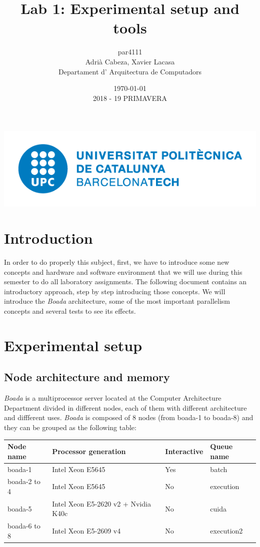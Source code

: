\documentclass[12]{article}
\author{par4111 \\ Adrià Cabeza, Xavier Lacasa \\ Departament d' Arquitectura de Computadors}
\title{Lab 1: Experimental setup and tools}
\date{\today \\ 2018 - 19 PRIMAVERA}
\begin{document}
\maketitle
\vspace*{\fill}
\begin{center}
\includegraphics[scale=0.5]{images/UPClogo.png}
\end{center}

\newpage
\tableofcontents
\newpage
\section{Introduction}
In order to do properly this subject, first, we have to introduce some new concepts and hardware and software environment that we will use during this semester to do all laboratory assignments.  The following document contains an introductory approach, step by step introducing those concepts. We will introduce the \textit{Boada} architecture, some of the most important parallelism concepts and several tests to see its effects. 

\section{Experimental setup}
\subsection{Node architecture and memory}

\textit{Boada} is a multiprocessor server located at the Computer Architecture Department divided in different nodes, each of them with different architecture and diffferent uses. \textit{Boada} is composed of 8 nodes (from boada-1 to boada-8) and they can be grouped as the following table: 
\\
\begin{table}[h]
\begin{tabular}{|l|l|l|l|}
\hline
Node name    & Processor generation                & Interactive & Queue name \\ \hline
boada-1      & Intel Xeon E5645                    & Yes         & batch      \\
boada-2 to 4 & Intel Xeon E5645                    & No          & execution  \\
boada-5      & Intel Xeon E5-2620 v2 + Nvidia K40c & No          & cuida      \\
boada-6 to 8 & Intel Xeon E5-2609 v4               & No          & execution2 \\ \hline
\end{tabular}
\end{table}
\end{document}
